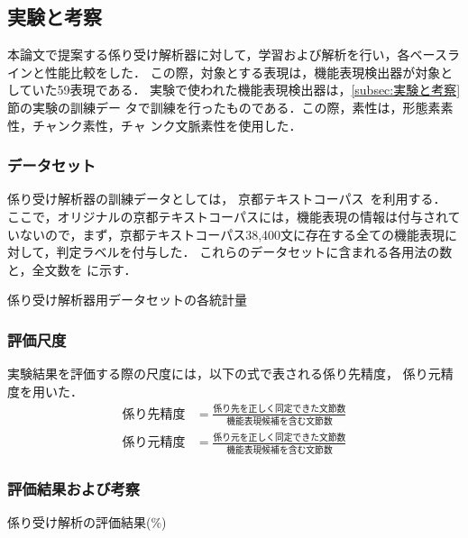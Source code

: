 \documentclass[japanese]{jnlp_1.3e}
\begin{document}
\subsection{実験と考察}
\label{subsec:係り受け解析の実験}
本論文で提案する係り受け解析器に対して，学習および解析を行い，各ベースラ
インと性能比較をした．
この際，対象とする表現は，機能表現検出器が対象としていた59表現である．
実験で使われた機能表現検出器は，\ref{subsec:実験と考察}節の実験の訓練デー
タで訓練を行ったものである．この際，素性は，形態素素性，チャンク素性，チャ
ンク文脈素性を使用した．

\subsubsection{データセット}
\label{subsec:cabocha_dataset}

係り受け解析器の訓練データとしては，
京都テキストコーパス~\cite{Kurohashi97bj}を利用する．
ここで，オリジナルの京都テキストコーパスには，機能表現の情報は付与されて
いないので，まず，京都テキストコーパス38,400文に存在する全ての機能表現に
対して，判定ラベルを付与した．
これらのデータセットに含まれる各用法の数と，全文数を
に示す．


\begin{table}[t]
  \caption{係り受け解析器用データセットの各統計量}
  \label{tbl:cabocha_dataset}

\end{table}



\subsubsection{評価尺度}

実験結果を評価する際の尺度には，以下の式で表される係り先精度，
係り元精度を用いた．
\begin{align*}
  \mbox{係り先精度} &= 
\frac{\mbox{係り先を正しく同定できた文節数}}{\mbox{機能表現候補を含む文節数}} \\[1zw]
  \mbox{係り元精度} &= 
\frac{\mbox{係り元を正しく同定できた文節数}}{\mbox{機能表現候補を含む文節数}} 
\end{align*}

\subsubsection{評価結果および考察}



\begin{table}[b]
  \caption{係り受け解析の評価結果(\%)}
  \label{tbl:cabocha_result}

\end{table}
\end{document}
